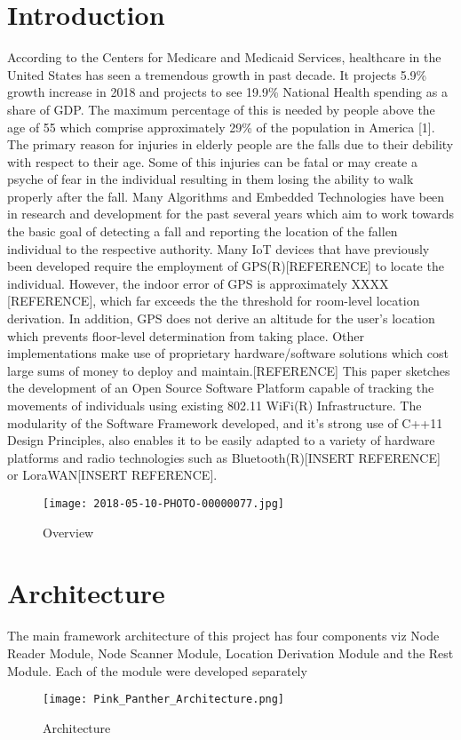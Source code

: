 \documentclass[conference]{IEEEtran}
\begin{document}
\section{Introduction}
\newline According to the Centers for Medicare and Medicaid Services, healthcare in the United States has seen a tremendous growth in past decade. It projects 5.9\% growth increase in 2018 and projects to see 19.9\% National Health spending as a share of GDP. The maximum percentage of this is needed by people above the age of 55 which comprise approximately 29\% of the population in America [1]. The primary reason for injuries in elderly people are the falls due to their debility with respect to their age. Some of this injuries can be fatal or may create a psyche of fear in the individual resulting in them losing the ability to walk properly after the fall. Many Algorithms and Embedded Technologies have been in research and development for the past several years which aim to work towards the basic goal of detecting a fall and reporting the location of the fallen individual to the respective authority.
\newline Many IoT devices that have previously been developed require the employment of GPS(R)[REFERENCE] to locate the individual. However, the indoor error of GPS is approximately XXXX [REFERENCE], which far exceeds the the threshold for room-level location derivation. In addition, GPS does not derive an altitude for the user's location which prevents floor-level determination from taking place. Other implementations make use of proprietary hardware/software solutions which cost large sums of money to deploy and maintain.[REFERENCE]
\newline This paper sketches the development of an Open Source Software Platform capable of tracking the movements of individuals using existing 802.11 WiFi(R) Infrastructure. The modularity of the Software Framework developed, and it's strong use of C++11 Design Principles, also enables it to be easily adapted to a variety of hardware platforms and radio technologies such as Bluetooth(R)[INSERT REFERENCE] or LoraWAN[INSERT REFERENCE].
\begin{figure}[H]
    \texttt{[image: 2018-05-10-PHOTO-00000077.jpg]}
    \caption{Overview}
    \end{figure}
    \ListofFigures
\section{Architecture}
The main framework architecture of this project has four components viz Node Reader Module, Node Scanner Module, Location Derivation Module and the Rest Module. Each of the module were developed separately
\begin{figure}[H]
    \texttt{[image: Pink\_Panther\_Architecture.png]}
    \caption{Architecture}
    \end{figure}
    \ListofFigures
    
\end{document}
